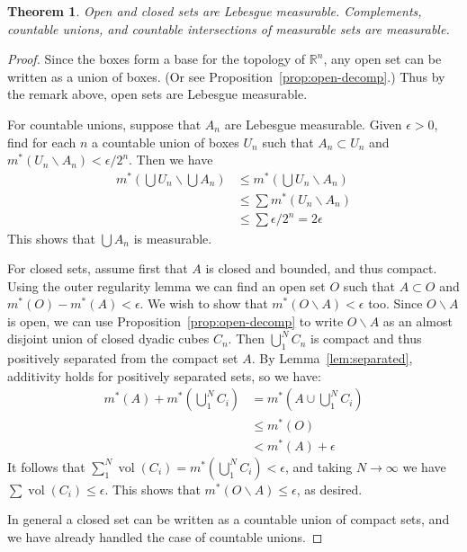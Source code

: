 \documentclass[10pt,oneside]{amsbook}
\renewcommand{\setminus}{\smallsetminus}
\newcommand{\RR}{{\mathbb R}}
\DeclareMathOperator{\vol}{vol}
\theoremstyle{definition}
\theoremstyle{plain}
\newtheorem{thm}{Theorem}[section]
\theoremstyle{definition}
\theoremstyle{remark}
\numberwithin{equation}{section}
\numberwithin{figure}{section}
\begin{document}
\begin{thm}
  Open and closed sets are Lebesgue measurable. Complements, countable unions, and countable intersections of measurable sets are measurable.
\end{thm}

\begin{proof}
  Since the boxes form a base for the topology of $\RR^n$, any open set can be written as a union of boxes. (Or see Proposition~\ref{prop:open-decomp}.) Thus by the remark above, open sets are Lebesgue measurable.

  For countable unions, suppose that $A_n$ are Lebesgue measurable. Given $\epsilon>0$, find for each $n$ a countable union of boxes $U_n$ such that $A_n\subset U_n$ and $m^*(U_n\setminus A_n)<\epsilon/2^n$. Then we have
  \begin{align*}
    m^*(\bigcup U_n\smallsetminus\bigcup A_n)
    &\leq m^*(\bigcup U_n\setminus A_n)\\
    &\leq \sum m^*(U_n\setminus A_n)\\
    &\leq \sum \epsilon/2^n=2\epsilon
  \end{align*}
  This shows that $\bigcup A_n$ is measurable.

  For closed sets, assume first that $A$ is closed and bounded, and thus compact. Using the outer regularity lemma we can find an open set $O$ such that $A\subset O$ and $m^*(O)-m^*(A)<\epsilon$. We wish to show that $m^*(O\setminus A)<\epsilon$ too. Since $O\setminus A$ is open, we can use Proposition~\ref{prop:open-decomp} to write $O\setminus A$ as an almost disjoint union of closed dyadic cubes $C_n$. Then $\bigcup_1^N C_n$ is compact and thus positively separated from the compact set $A$. By Lemma~\ref{lem:separated}, additivity holds for positively separated sets, so we have:
  \begin{align*}
    m^*(A)+m^*(\bigcup_1^N C_i)&=m^*(A\cup\bigcup_1^N C_i)\\
                              &\leq m^*(O)\\
                              &<m^*(A)+\epsilon
  \end{align*}
  It follows that $\sum_1^N\vol(C_i)=m^*(\bigcup_1^NC_i)<\epsilon$, and taking $N\to\infty$ we have $\sum\vol(C_i)\leq\epsilon$. This shows that $m^*(O\setminus A)\leq\epsilon$, as desired.

  In general a closed set can be written as a countable union of compact sets, and we have already handled the case of countable unions.


\end{proof}
\end{document}
